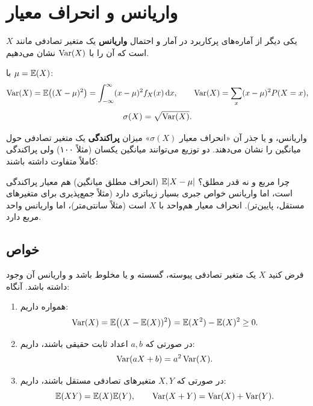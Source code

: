 \section[واریانس و انحراف معیار]{واریانس و انحراف معیار {\large{}}}

یکی دیگر از آماره‌های پرکاربرد در آمار و احتمال \textbf{واریانس} یک متغیر تصادفی مانند $X$ است که آن را با $\operatorname{Var}(X)$ نشان می‌دهیم.

\begin{definition}
با $\mu=\mathbb{E}(X)$:
\[
\operatorname{Var}(X)=\mathbb{E}\big((X-\mu)^2\big)=\int_{-\infty}^{\infty}(x-\mu)^2f_X(x)\,\mathrm{d} x,\qquad
\operatorname{Var}(X)=\sum_x(x-\mu)^2P(X=x),
\]
\[
\sigma(X)=\sqrt{\operatorname{Var}(X)} .
\]
\end{definition}

واریانس، و یا جذر آن «انحراف معیار $\sigma(X)$» میزان \textbf{پراکندگی} یک متغیر تصادفی حول میانگین را نشان می‌دهند. دو توزیع می‌توانند میانگین یکسان (مثلاً ۱۰۰) ولی پراکندگی کاملاً متفاوت داشته باشند:

\begin{center}
\end{center}

\begin{note}
\notetitle چرا مربع و نه قدر مطلق؟ $\mathbb{E}|X-\mu|$ (انحراف مطلق میانگین) هم معیار پراکندگی است، اما واریانس خواص جبری بسیار زیباتری دارد (مثلاً جمع‌پذیری برای متغیرهای مستقل، پایین‌تر). انحراف معیار هم‌واحد با $X$ است (مثلاً سانتی‌متر)، اما واریانس واحد مربع دارد.
\end{note}

\subsection{خواص}
\begin{theorem}
فرض کنید $X$ یک متغیر تصادفی پیوسته، گسسته و یا مخلوط باشد و واریانس آن وجود داشته باشد. آنگاه:
\begin{enumerate}
\item همواره داریم:
\[
\operatorname{Var}(X)=\mathbb{E}\big((X-\mathbb{E}(X))^2\big)=\mathbb{E}(X^2)-\mathbb{E}(X)^2\ge0 .
\]
\item در صورتی که $a,b$ اعداد ثابت حقیقی باشند، داریم:
\[
\operatorname{Var}(aX+b)=a^2\operatorname{Var}(X).
\]
\item در صورتی که $X,Y$ متغیرهای تصادفی \textcolor{red!70!black}{مستقل} باشند، داریم:
\[
\mathbb{E}(XY)=\mathbb{E}(X)\mathbb{E}(Y),\qquad \operatorname{Var}(X+Y)=\operatorname{Var}(X)+\operatorname{Var}(Y).
\]
\end{enumerate}
\end{theorem}

